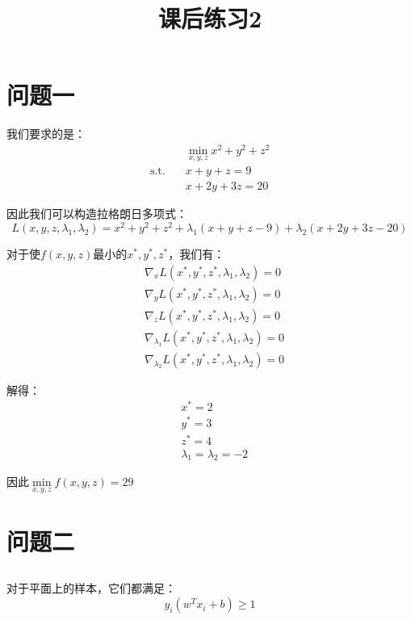 \documentclass[12pt, a4paper]{article}
\title{课后练习2}
\author{}
\date{}
\begin{document}
\maketitle %

\section{问题一}

我们要求的是：
\begin{align*}
    &\mathop{min}\limits_{x,y,z}x^2+y^2+z^2\\
    \text{s.t.} \quad & x+y+z=9\\
    &x+2y+3z=20
\end{align*}

因此我们可以构造拉格朗日多项式：
\begin{equation*}
    L(x,y,z,\lambda_1,\lambda_2)=x^2+y^2+z^2 + \lambda_1(x+y+z-9) + \lambda_2(x+2y+3z-20)
\end{equation*}

对于使$f(x,y,z)$最小的$x^*,y^*,z^*$，我们有：
\begin{align*}
    &\nabla_x L(x^*,y^*,z^*,\lambda_1,\lambda_2)=0\\
    &\nabla_y L(x^*,y^*,z^*,\lambda_1,\lambda_2)=0\\
    &\nabla_z L(x^*,y^*,z^*,\lambda_1,\lambda_2)=0\\
    &\nabla_{\lambda_1} L(x^*,y^*,z^*,\lambda_1,\lambda_2)=0\\
    &\nabla_{\lambda_2} L(x^*,y^*,z^*,\lambda_1,\lambda_2)=0
\end{align*}

解得：
\begin{align*}
    &x^*=2\\
    &y^*=3\\
    &z^*=4\\
    &\lambda_1=\lambda_2=-2
\end{align*}

因此$\mathop{min}\limits_{x,y,z}f(x,y,z)=29$


\section{问题二}


\subsection{}

对于平面上的样本，它们都满足：
\begin{equation*}
    y_i(w^T x_i+b)\geq 1
\end{equation*}
\end{document}
